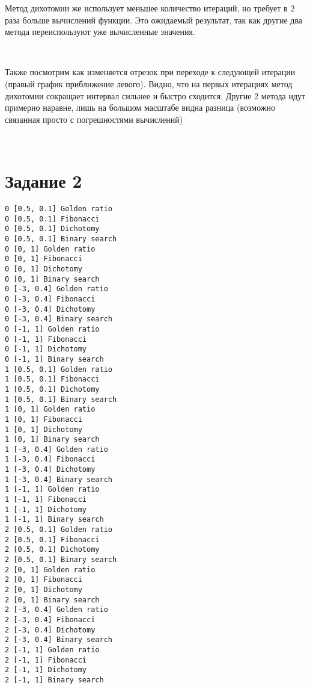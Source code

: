 \documentclass{article}
\begin{document}
Метод дихотомии же использует меньшее количество итераций, но требует в
\(2\) раза больше вычислений функции. Это ожидаемый результат, так как
другие два метода переиспользуют уже вычисленные значения.

    \begin{center}
    \end{center}
    { \hspace*{\fill} \\}
    
    Также посмотрим как изменяется отрезок при переходе к следующей итерации
(правый график приближение левого). Видно, что на первых итерациях метод
дихотомии сокращает интервал сильнее и быстро сходится. Другие 2 метода
идут примерно наравне, лишь на большом масштабе видна разница (возможно
связанная просто с погрешностями вычислений)

    \begin{center}
    \end{center}
    { \hspace*{\fill} \\}
    
    \newpage

\hypertarget{ux437ux430ux434ux430ux43dux438ux435-2}{%
\section{Задание 2}\label{ux437ux430ux434ux430ux43dux438ux435-2}}

    \begin{Verbatim}[commandchars=\\\{\}]
0 [0.5, 0.1] Golden ratio
0 [0.5, 0.1] Fibonacci
0 [0.5, 0.1] Dichotomy
0 [0.5, 0.1] Binary search
0 [0, 1] Golden ratio
0 [0, 1] Fibonacci
0 [0, 1] Dichotomy
0 [0, 1] Binary search
0 [-3, 0.4] Golden ratio
0 [-3, 0.4] Fibonacci
0 [-3, 0.4] Dichotomy
0 [-3, 0.4] Binary search
0 [-1, 1] Golden ratio
0 [-1, 1] Fibonacci
0 [-1, 1] Dichotomy
0 [-1, 1] Binary search
1 [0.5, 0.1] Golden ratio
1 [0.5, 0.1] Fibonacci
1 [0.5, 0.1] Dichotomy
1 [0.5, 0.1] Binary search
1 [0, 1] Golden ratio
1 [0, 1] Fibonacci
1 [0, 1] Dichotomy
1 [0, 1] Binary search
1 [-3, 0.4] Golden ratio
1 [-3, 0.4] Fibonacci
1 [-3, 0.4] Dichotomy
1 [-3, 0.4] Binary search
1 [-1, 1] Golden ratio
1 [-1, 1] Fibonacci
1 [-1, 1] Dichotomy
1 [-1, 1] Binary search
2 [0.5, 0.1] Golden ratio
2 [0.5, 0.1] Fibonacci
2 [0.5, 0.1] Dichotomy
2 [0.5, 0.1] Binary search
2 [0, 1] Golden ratio
2 [0, 1] Fibonacci
2 [0, 1] Dichotomy
2 [0, 1] Binary search
2 [-3, 0.4] Golden ratio
2 [-3, 0.4] Fibonacci
2 [-3, 0.4] Dichotomy
2 [-3, 0.4] Binary search
2 [-1, 1] Golden ratio
2 [-1, 1] Fibonacci
2 [-1, 1] Dichotomy
2 [-1, 1] Binary search
    \end{Verbatim}
\end{document}
